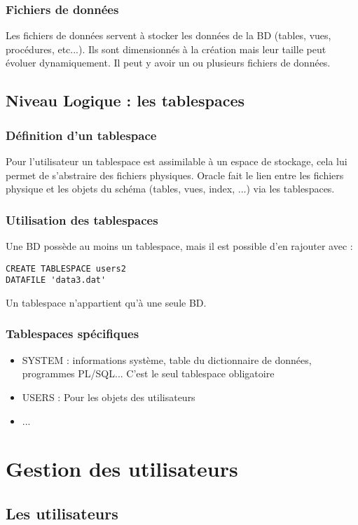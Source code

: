\documentclass[10pt,a4paper,twoside]{article}
\begin{document}
\subsubsection{Fichiers de données}
Les fichiers de données servent à stocker les données de la BD (tables, vues, procédures, etc...). Ils sont dimensionnés à la création mais leur taille peut évoluer dynamiquement. Il peut y avoir un ou plusieurs fichiers de données.

\subsection{Niveau Logique : les tablespaces}
\subsubsection{Définition d'un tablespace}
Pour l'utilisateur un tablespace est assimilable à un espace de stockage, cela lui permet de s'abstraire des fichiers physiques. Oracle fait le lien entre les fichiers physique et les objets du schéma (tables, vues, index, ...) via les tablespaces.

\subsubsection{Utilisation des tablespaces}
Une BD possède au moins un tablespace, mais il est possible d'en rajouter avec :
\begin{verbatim}
CREATE TABLESPACE users2
DATAFILE 'data3.dat'
\end{verbatim}
Un tablespace n'appartient qu'à une seule BD.

\subsubsection{Tablespaces spécifiques}
\begin{itemize}
\item SYSTEM : informations système, table du dictionnaire de données, programmes PL/SQL... C'est le seul tablespace obligatoire
\item USERS : Pour les objets des utilisateurs
\item ...
\end{itemize}


\section{Gestion des utilisateurs}
\subsection{Les utilisateurs}
\end{document}
